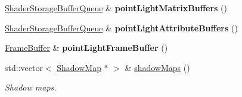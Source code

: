 \begin{Indent}
\begin{DoxyCompactItemize}
\mbox{\hyperlink{classrev_1_1_buffer_queue}{Shader\+Storage\+Buffer\+Queue}} \& {\bfseries point\+Light\+Matrix\+Buffers} ()
\item 
\mbox{\label{classrev_1_1_lighting_settings_a2ccbb739a3834dc0ae03fbb073766ac4}} 
\mbox{\hyperlink{classrev_1_1_buffer_queue}{Shader\+Storage\+Buffer\+Queue}} \& {\bfseries point\+Light\+Attribute\+Buffers} ()
\item 
\mbox{\label{classrev_1_1_lighting_settings_a111cfbea081f04aa2978a3b267aebe4f}} 
\mbox{\hyperlink{classrev_1_1_frame_buffer}{Frame\+Buffer}} \& {\bfseries point\+Light\+Frame\+Buffer} ()
\item 
\mbox{\label{classrev_1_1_lighting_settings_a696bce282acafd366d54755af617f565}} 
std\+::vector$<$ \mbox{\hyperlink{classrev_1_1_shadow_map}{Shadow\+Map}} $\ast$ $>$ \& \mbox{\hyperlink{classrev_1_1_lighting_settings_a696bce282acafd366d54755af617f565}{shadow\+Maps}} ()
\begin{DoxyCompactList}\small\item\em Shadow maps. \end{DoxyCompactList}\end{DoxyCompactItemize}
\end{Indent}
